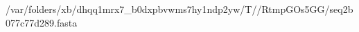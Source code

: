 \documentclass[10pt]{article}
\begin{document}
\begin{texshade}{/var/folders/xb/dhqq1mrx7_b0dxpbvwms7hy1ndp2yw/T//RtmpGOs5GG/seq2b077c77d289.fasta}
\hideconsensus
{}
\hidelogoscale
{}
\showlegend
\end{texshade}
\end{document}
